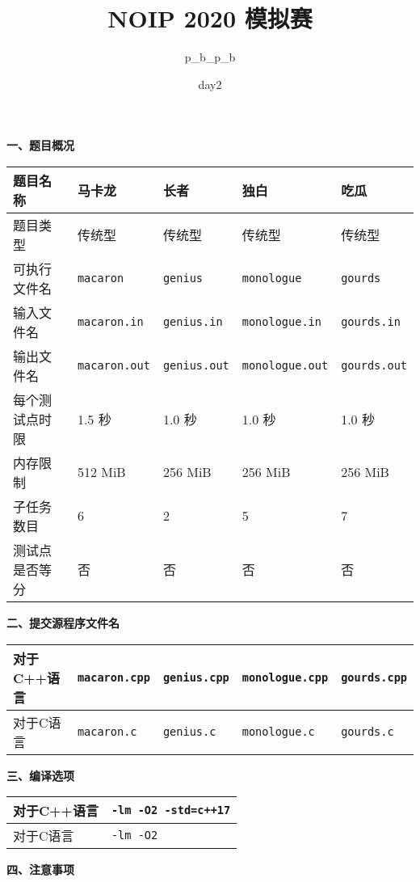 \documentclass[UTF8]{ctexart}
\author{p\_b\_p\_b}
\date{day2}
\title{\zihao{2}\textbf{NOIP 2020 模拟赛}}
\begin{document}
	\maketitle
	\setcounter{page}{1}
	\textbf{一、题目概况}
	\begin{center}
		\begin{tabular}{*{5}{|L{7em}}|}
			\hline
			题目名称 & 马卡龙 & 长者 & 独白 & 吃瓜\\ \hline
			题目类型 & 传统型 & 传统型 & 传统型 & 传统型\\ \hline
			可执行文件名 & \texttt{macaron} & \texttt{genius} & \texttt{monologue} & \texttt{gourds}\\ \hline
			输入文件名 & \texttt{macaron.in} & \texttt{genius.in} & \texttt{monologue.in} & \texttt{gourds.in}\\ \hline
			输出文件名 & \texttt{macaron.out} & \texttt{genius.out} & \texttt{monologue.out} & \texttt{gourds.out} \\ \hline
			每个测试点时限 & 1.5 秒 & 1.0 秒 & 1.0 秒 & 1.0 秒\\ \hline
			内存限制 & 512 MiB & 256 MiB & 256 MiB & 256 MiB \\ \hline
			子任务数目 & 6 & 2 & 5 & 7 \\ \hline
			测试点是否等分 & 否 & 否 & 否 & 否 \\ \hline
		\end{tabular}
	\end{center}
	\textbf{二、提交源程序文件名}
	\begin{center}
		\begin{tabular}{*{5}{|L{7em}}|}
			\hline
			对于C++语言 & \texttt{macaron.cpp} & \texttt{genius.cpp} & \texttt{monologue.cpp} & \texttt{gourds.cpp}\\ \hline
			对于C语言 & \texttt{macaron.c} & \texttt{genius.c} & \texttt{monologue.c} & \texttt{gourds.c}\\ \hline
		\end{tabular}
	\end{center}
	\textbf{三、编译选项}
	\begin{center}
	\begin{tabular}{|L{7em}|C{31.4em}|}
	\hline
	    对于C++语言 & \texttt{-lm -O2 -std=c++17} \\ \hline
	    对于C语言 & \texttt{-lm -O2} \\ \hline
	\end{tabular}
	\end{center}
	\textbf{四、注意事项}
\end{document}
